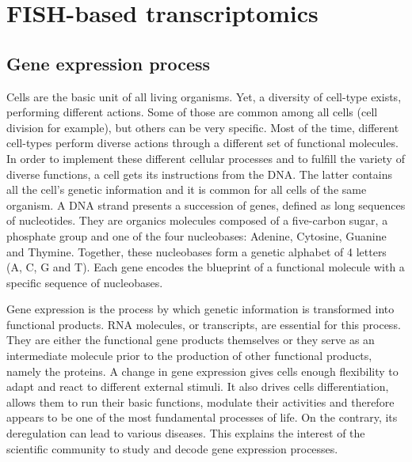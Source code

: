 
\graphicspath{{./figures/introduction/}}

\chapter{FISH-based transcriptomics}
\label{ch:introduction}

\minitoc
\newpage

\section{Gene expression process}
\label{sec:gene_expression}

Cells are the basic unit of all living organisms.
Yet, a diversity of cell-type exists, performing different actions.
Some of those are common among all cells (cell division for example), but others can be very specific.
Most of the time, different cell-types perform diverse actions through a different set of functional molecules.
In order to implement these different cellular processes and to fulfill the variety of diverse functions, a cell gets its instructions from the \ac{DNA}.
The latter contains all the cell's genetic information and it is common for all cells of the same organism.
A \ac{DNA} strand presents a succession of genes, defined as long sequences of nucleotides.
They are organics molecules composed of a five-carbon sugar, a phosphate group and one of the four nucleobases: Adenine, Cytosine, Guanine and Thymine.
Together, these nucleobases form a genetic alphabet of 4 letters (A, C, G and  T).
Each gene encodes the blueprint of a functional molecule with a specific sequence of nucleobases.

Gene expression is the process by which genetic information is transformed into functional products.
\ac{RNA} molecules, or transcripts, are essential for this process.
They are either the functional gene products themselves or they serve as an intermediate molecule prior to the production of other functional products, namely the proteins.
A change in gene expression gives cells enough flexibility to adapt and react to different external stimuli.
It also drives cells differentiation, allows them to run their basic functions, modulate their activities and therefore appears to be one of the most fundamental processes of life.
On the contrary, its deregulation can lead to various diseases.
This explains the interest of the scientific community to study and decode gene expression processes.


